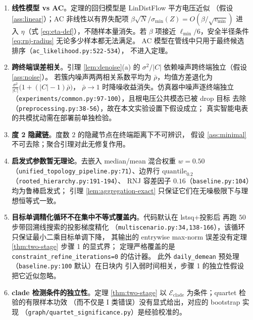 \documentclass[UTF8,11pt]{ctexart}
\begin{document}
\begin{enumerate}[leftmargin=2em]
  \item \textbf{线性模型 vs AC}。定理的回归模型是 LinDistFlow 平方电压近似
        （假设 \ref{ass:linear}）；AC 非线性以有界失配项
        $\beta\sqrt{N}/\sigma_{\min}(Z)=O(\beta/\sqrt{v_{\min}})$ 进入
        $\eta$（式 \eqref{eq:eta-def}），不随样本量消失。若 $\beta$ 项接近
        $\ell_{\min}/6$，安全半径条件 \eqref{eq:rnj-radius} 无论多少样本都无法满足。
        AC 模型在管线中只用于最终候选排序（\texttt{ac\_likelihood.py:522-534}），
        不进入定理。
  \item \textbf{跨终端误差相关}。引理 \ref{lem:denoise}(a) 的
        $\sigma^2/|C|$ 依赖噪声跨终端独立（假设 \ref{ass:noise}）。
        若簇内噪声两两相关系数平均为 $\bar\rho$，均值方差退化为
        $\frac{\sigma^2}{|C|}\bigl(1+(|C|-1)\bar\rho\bigr)$，
        $\bar\rho\to 1$ 时降噪收益消失。仿真器中噪声逐终端独立
        （\texttt{experiments/common.py:97-100}），且根电压公共模态已被 drop 目标
        去除（\texttt{preprocessing.py:38-56}），故在本文实验设置下假设成立；
        真实智能电表的共模扰动需在部署前单独检验。
  \item \textbf{度 2 隐藏链}。度数 $2$ 的隐藏节点在终端距离下不可辨识，
        假设 \ref{ass:minimal} 不可去除；聚合引理对此无修复作用。
  \item \textbf{启发式参数暂无理论}。去嵌入 median/mean 混合权重
        $w=0.50$（\texttt{unified\_topology\_pipeline.py:71}）、边界行
        $\mathrm{quantile}_{0.2}$（\texttt{rooted\_hierarchy.py:191-194}）、
        RNJ 容差因子 $0.16$（\texttt{baseline.py:104}）均为鲁棒启发式；
        引理 \ref{lem:aggregation-exact} 只保证它们在无噪极限下与理想恒等式一致。
  \item \textbf{目标单调精化循环不在集中不等式覆盖内}。代码默认在 lstsq+投影后
        再跑 $50$ 步带回溯线搜索的投影梯度精化
        （\texttt{multiscenario.py:34,138-166}），该循环只保证最小二乘目标单调下降，
        其输出的 entrywise max-norm 误差没有定理 \ref{thm:two-stage} 步骤 1 的显式界；
        定理严格覆盖的是 \texttt{constraint\_refine\_iterations=0} 的估计器。
        此外 \texttt{daily\_demean} 预处理（\texttt{baseline.py:100} 默认）在日块内
        引入弱时间相关，步骤 1 的独立性假设把它近似忽略。
  \item \textbf{clade 检测条件的独立性}。定理 \ref{thm:two-stage} 以
        $\mathcal{E}_{\mathrm{clade}}$ 为条件；quartet 检验的有限样本功效
        （而不仅是 I 类错误）没有显式给出，对应的 bootstrap 实现
        （\texttt{graph/quartet\_significance.py}）是经验校准的。

\end{enumerate}
\end{document}

